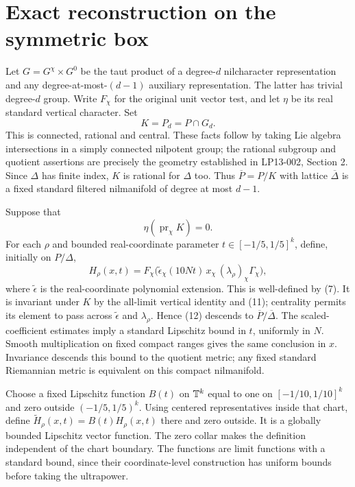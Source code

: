 \documentclass[11pt]{article}
\begin{document}
\section{Exact reconstruction on the symmetric box}
Let $G=G^{\chi}\times G^0$ be the taut product of a degree-$d$ nilcharacter
representation and any degree-at-most-$(d-1)$ auxiliary representation.
The latter has trivial degree-$d$ group. Write $F_\chi$ for the original
unit vector test, and let $\eta$ be its real standard vertical character.
Set
\[
                K=P_d=P\cap G_d.
\]
This is connected, rational and central. These facts follow by taking Lie
algebra intersections in a simply connected nilpotent group; the rational
subgroup and quotient assertions are precisely the geometry established
in LP13-002, Section 2. Since $\Delta$ has finite index, $K$ is rational
for $\Delta$ too. Thus $\overline P=P/K$ with lattice
$\overline\Delta$ is a fixed standard filtered nilmanifold of degree at
most $d-1$.

Suppose that
\[
                  \eta(\operatorname{pr}_\chi K)=0.            \tag{11}
\]
For each $\rho$ and bounded real-coordinate parameter $t\in[-1/5,1/5]^k$,
define, initially on $P/\Delta$,
\[
 H_\rho(x,t)=F_\chi\bigl(
   \widetilde\epsilon_\chi(10Nt)\,x_\chi\,(\lambda_\rho)_\chi
                                                    \Gamma_\chi\bigr), \tag{12}
\]
where $\widetilde\epsilon$ is the real-coordinate polynomial extension.
This is well-defined by (7). It is invariant under $K$ by the all-limit
vertical identity and (11); centrality permits its element to pass across
$\widetilde\epsilon$ and $\lambda_\rho$. Hence (12) descends to
$\overline P/\overline\Delta$.
The scaled-coefficient estimates imply a standard Lipschitz bound in $t$,
uniformly in $N$. Smooth multiplication on fixed compact ranges gives the
same conclusion in $x$. Invariance descends this bound to the quotient
metric; any fixed standard Riemannian metric is equivalent on this compact
nilmanifold.

Choose a fixed Lipschitz function $B(t)$ on $\mathbb T^k$ equal to one on
$[-1/10,1/10]^k$ and zero outside $(-1/5,1/5)^k$.
Using centered representatives inside that chart, define
$\widetilde H_\rho(x,t)=B(t)H_\rho(x,t)$ there and zero outside.
It is a globally bounded Lipschitz vector function. The zero collar makes
the definition independent of the chart boundary. The functions are limit
functions with a standard bound, since their coordinate-level construction
has uniform bounds before taking the ultrapower.
\end{document}
